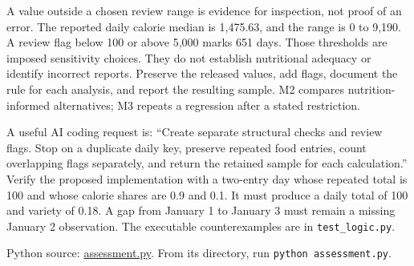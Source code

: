 A value outside a chosen review range is evidence for inspection, not
proof of an error. The reported daily calorie median is 1,475.63, and
the range is 0 to 9,190. A review flag below 100 or above 5,000 marks
651 days. Those thresholds are imposed sensitivity choices. They do not
establish nutritional adequacy or identify incorrect reports. Preserve
the released values, add flags, document the rule for each analysis, and
report the resulting sample. M2 compares nutrition-informed
alternatives; M3 repeats a regression after a stated restriction.

A useful AI coding request is: ``Create separate structural checks and
review flags. Stop on a duplicate daily key, preserve repeated food
entries, count overlapping flags separately, and return the retained
sample for each calculation.'' Verify the proposed implementation with a
two-entry day whose repeated total is 100 and whose calorie shares are
0.9 and 0.1. It must produce a daily total of 100 and variety of 0.18. A
gap from January 1 to January 3 must remain a missing January 2
observation. The executable counterexamples are in
\texttt{test\_logic.py}.

\FloatBarrier
{}
Python source:
\href{../03_Data_and_Code/mHealth/recurring_examples/assessment.py}{assessment.py}.
From its directory, run \texttt{python\ assessment.py}.

